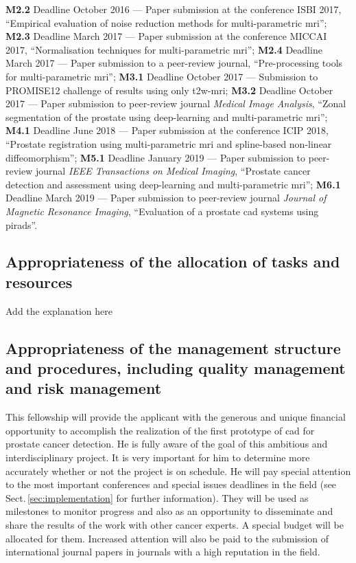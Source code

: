 \textbf{M2.2} Deadline October 2016 --- Paper submission at the conference ISBI 2017, ``Empirical evaluation of noise reduction methods for multi-parametric \ac{mri}'';
\textbf{M2.3} Deadline March 2017 --- Paper submission at the conference MICCAI 2017, ``Normalisation techniques for multi-parametric \ac{mri}'';
\textbf{M2.4} Deadline March 2017 --- Paper submission to a peer-review journal, ``Pre-processing tools for multi-parametric \ac{mri}'';
\textbf{M3.1} Deadline October 2017 --- Submission to PROMISE12 challenge of results using only \ac{t2w}-\ac{mri};
\textbf{M3.2} Deadline October 2017 --- Paper submission to peer-review journal \emph{Medical Image Analysis}, ``Zonal segmentation of the prostate using deep-learning and multi-parametric \ac{mri}'';
\textbf{M4.1} Deadline June 2018 --- Paper submission at the conference ICIP 2018, ``Prostate registration using multi-parametric \ac{mri} and spline-based non-linear diffeomorphism'';
\textbf{M5.1} Deadline January 2019 --- Paper submission to peer-review journal \emph{IEEE Transactions on Medical Imaging}, ``Prostate cancer detection and assessment using deep-learning and multi-parametric \ac{mri}'';
\textbf{M6.1} Deadline March 2019 --- Paper submission to peer-review journal \emph{Journal of Magnetic Resonance Imaging}, ``Evaluation of a prostate \ac{cad} systems using \ac{pirads}''.

\subsection{Appropriateness of the allocation of tasks and resources}

{\color{red} Add the explanation here}

\subsection{Appropriateness of the management structure and procedures, including quality management and risk management}

This fellowship will provide the applicant with the generous and unique financial opportunity to accomplish the realization of the first prototype of \ac{cad} for prostate cancer detection.
He is fully aware of the goal of this ambitious and interdisciplinary project.
It is very important for him to determine more accurately whether or not the project is on schedule. 
He will pay special attention to the most important conferences and special issues deadlines in the field (see Sect.\,\ref{sec:implementation} for further information). 
They will be used as milestones to monitor progress and also as an opportunity to disseminate and share the results of the work with other cancer experts.
A special budget will be allocated for them. 
Increased  attention will also be paid to the submission of international journal papers in journals with a high reputation in the field.

